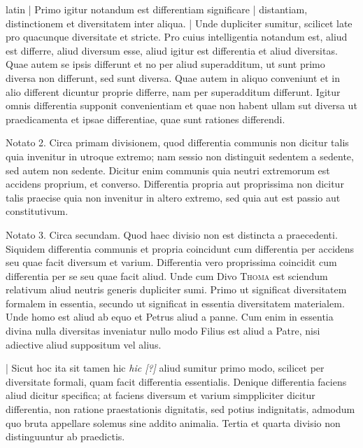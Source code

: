 \begin{otherlanguage*}{latin}
\pstart
\noindent%
 \textnormal{|} Primo igitur notandum est differentiam significare \textnormal{|} distantiam, distinctionem et diversitatem inter aliqua. \textnormal{|}   Unde dupliciter sumitur, scilicet late pro quacunque diversitate et stricte. Pro cuius intelligentia notandum est, aliud est differre, aliud diversum esse, aliud igitur est differentia et aliud diversitas. Quae autem se ipsis differunt et no per aliud superadditum, ut sunt primo diversa non differunt, sed sunt diversa. Quae autem in aliquo conveniunt et in alio different dicuntur proprie differre, nam per superadditum differunt. Igitur omnis differentia supponit convenientiam et quae non habent ullam sut diversa ut praedicamenta et ipsae differentiae, quae sunt rationes differendi. 
\pend

\pstart
 Notato 2. Circa primam divisionem, quod differentia communis non dicitur talis quia invenitur in utroque extremo; nam sessio non distinguit sedentem a sedente, sed autem non sedente. Dicitur enim communis quia neutri extremorum est accidens proprium, et converso. Differentia propria aut proprissima non dicitur talis praecise quia non invenitur in altero extremo, sed quia aut est passio aut constitutivum. 
\pend

\pstart
 Notato 3. Circa secundam. Quod haec divisio non est distincta a praecedenti. Siquidem differentia communis et propria coincidunt cum differentia per accidens seu quae facit diversum et varium. Differentia vero proprissima coincidit cum differentia per se seu quae facit aliud. Unde cum Divo \textsc{Thoma} est sciendum relativum aliud neutris generis dupliciter sumi. Primo ut significat diversitatem formalem in essentia, secundo ut significat in essentia diversitatem materialem. Unde homo est aliud ab equo et Petrus aliud a panne. Cum enim in essentia divina nulla diversitas inveniatur nullo modo Filius est aliud a Patre, nisi adiective aliud suppositum vel alius. 
\pend

\pstart
 \textnormal{|} Sicut hoc ita sit tamen hic \emph{hic [?]} aliud sumitur primo modo, scilicet per diversitate formali, quam facit differentia essentialis. Denique differentia faciens aliud dicitur specifica; at faciens diversum et varium simppliciter dicitur differentia, non ratione praestationis dignitatis, sed potius indignitatis, admodum quo bruta appellare solemus sine addito animalia. Tertia et quarta divisio non distinguuntur ab praedictis. 
\pend


\end{otherlanguage*}
